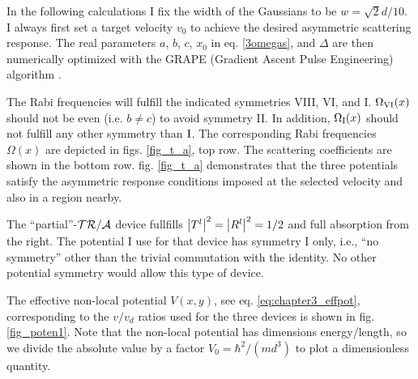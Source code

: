 In the following calculations I fix the width of the Gaussians to be $w= {\sqrt{2}}d/{10}$.
I always first set a target velocity $v_0$ to achieve the desired asymmetric scattering response.
The real parameters $a$, $b$, $c$, $x_0$ in eq. \eqref{3omegas}, and  $\Delta$
are then numerically optimized with the GRAPE (Gradient Ascent Pulse Engineering) algorithm \cite{Khaneja2005,Wu2015}.

The Rabi frequencies will fulfill the indicated symmetries VIII, VI, and I. $\Omega_{\rm VI}(x)$ should not be even (i.e. $b \neq c$) to avoid symmetry II. In addition, $\Omega_{\rm I}(x)$ should not fulfill any other symmetry than ${\rm I}$.
The corresponding Rabi frequencies $\Omega(x)$ are  depicted in figs. \ref{fig_t_a}, top row.
The scattering coefficients are shown in the bottom row. fig. \ref{fig_t_a} demonstrates that the three potentials satisfy the asymmetric response conditions imposed
at the selected velocity and also in a region nearby.

The ``partial''-${\cal TR/A}$  device fullfills $\left| T^l \right|^2 = \left| R^l \right|^2 = 1/2$ and full absorption from the right.
The potential I use for that device has symmetry I only, i.e., ``no symmetry'' other than the trivial commutation with the identity. No other potential symmetry would allow this type of device.

The effective non-local potential $V(x,y)$, see eq. \eqref{eq:chapter3_effpot}, corresponding to the $v/v_d$ ratios used for the three devices is shown in fig. \ref{fig_poten1}. Note that the non-local potential has dimensions  energy/length, so  we
divide the absolute value by a factor $V_0=\hbar^2/(m d^3)$ to plot a dimensionless quantity.


